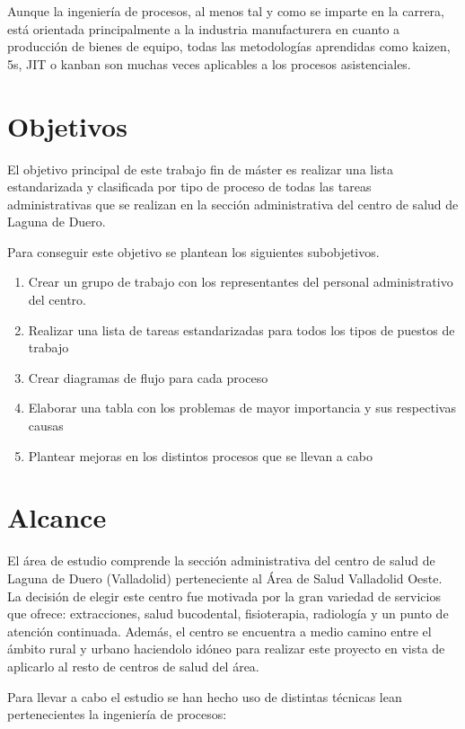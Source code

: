 Aunque la ingeniería de procesos, al menos tal y como se imparte en la carrera, está orientada principalmente a la industria manufacturera en cuanto a producción de bienes de equipo, todas las metodologías aprendidas como kaizen, 5s, JIT o kanban son muchas veces aplicables a los procesos asistenciales.

\section{Objetivos}

El objetivo principal de este trabajo fin de máster es realizar una lista estandarizada y clasificada por tipo de proceso de todas las tareas administrativas que se realizan en la sección administrativa del centro de salud de Laguna de Duero.

Para conseguir este objetivo se plantean los siguientes subobjetivos.

\begin{enumerate}
    \item Crear un grupo de trabajo con los representantes del personal administrativo del centro.
    \item Realizar una lista de tareas estandarizadas para todos los tipos de puestos de trabajo
    \item Crear diagramas de flujo para cada proceso
    \item Elaborar una tabla con los problemas de mayor importancia y sus respectivas causas
    \item Plantear mejoras en los distintos procesos que se llevan a cabo
\end{enumerate}

\section{Alcance}

El área de estudio comprende la sección administrativa del centro de salud de Laguna de Duero (Valladolid) perteneciente al Área de Salud Valladolid Oeste. La decisión de elegir este centro fue motivada por la gran variedad de servicios que ofrece: extracciones, salud bucodental, fisioterapia, radiología y un punto de atención continuada. Además, el centro se encuentra a medio camino entre el ámbito rural y urbano haciendolo idóneo para realizar este proyecto en vista de aplicarlo al resto de centros de salud del área.

Para llevar a cabo el estudio se han hecho uso de distintas técnicas lean pertenecientes la ingeniería de procesos:


